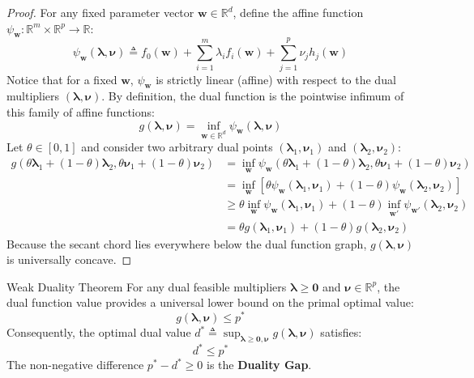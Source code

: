 \begin{proof}
For any fixed parameter vector $\mathbf{w} \in \mathbb{R}^d$, define the affine function $\psi_{\mathbf{w}}: \mathbb{R}^m \times \mathbb{R}^p \to \mathbb{R}$:
\begin{equation}
\psi_{\mathbf{w}}(\boldsymbol{\lambda}, \boldsymbol{\nu}) \triangleq f_0(\mathbf{w}) + \sum_{i=1}^m \lambda_i f_i(\mathbf{w}) + \sum_{j=1}^p \nu_j h_j(\mathbf{w})
\end{equation}
Notice that for a fixed $\mathbf{w}$, $\psi_{\mathbf{w}}$ is strictly linear (affine) with respect to the dual multipliers $(\boldsymbol{\lambda}, \boldsymbol{\nu})$.
By definition, the dual function is the pointwise infimum of this family of affine functions:
\begin{equation}
g(\boldsymbol{\lambda}, \boldsymbol{\nu}) = \inf_{\mathbf{w} \in \mathbb{R}^d} \psi_{\mathbf{w}}(\boldsymbol{\lambda}, \boldsymbol{\nu})
\end{equation}
Let $\theta \in [0, 1]$ and consider two arbitrary dual points $(\boldsymbol{\lambda}_1, \boldsymbol{\nu}_1)$ and $(\boldsymbol{\lambda}_2, \boldsymbol{\nu}_2)$:
\begin{align}
g(\theta \boldsymbol{\lambda}_1 + (1-\theta)\boldsymbol{\lambda}_2, \theta \boldsymbol{\nu}_1 + (1-\theta)\boldsymbol{\nu}_2)
&= \inf_{\mathbf{w}} \psi_{\mathbf{w}}(\theta \boldsymbol{\lambda}_1 + (1-\theta)\boldsymbol{\lambda}_2, \theta \boldsymbol{\nu}_1 + (1-\theta)\boldsymbol{\nu}_2) \nonumber \\
&= \inf_{\mathbf{w}} \left[ \theta \psi_{\mathbf{w}}(\boldsymbol{\lambda}_1, \boldsymbol{\nu}_1) + (1-\theta) \psi_{\mathbf{w}}(\boldsymbol{\lambda}_2, \boldsymbol{\nu}_2) \right] \nonumber \\
&\ge \theta \inf_{\mathbf{w}} \psi_{\mathbf{w}}(\boldsymbol{\lambda}_1, \boldsymbol{\nu}_1) + (1-\theta) \inf_{\mathbf{w}'} \psi_{\mathbf{w}'}(\boldsymbol{\lambda}_2, \boldsymbol{\nu}_2) \nonumber \\
&= \theta g(\boldsymbol{\lambda}_1, \boldsymbol{\nu}_1) + (1-\theta) g(\boldsymbol{\lambda}_2, \boldsymbol{\nu}_2)
\end{align}
Because the secant chord lies everywhere below the dual function graph, $g(\boldsymbol{\lambda}, \boldsymbol{\nu})$ is universally concave.
\end{proof}

\begin{theorembox}{Weak Duality Theorem}
For any dual feasible multipliers $\boldsymbol{\lambda} \ge \mathbf{0}$ and $\boldsymbol{\nu} \in \mathbb{R}^p$, the dual function value provides a universal lower bound on the primal optimal value:
\begin{equation}
g(\boldsymbol{\lambda}, \boldsymbol{\nu}) \le p^*
\label{eq:weak_duality}
\end{equation}
Consequently, the optimal dual value $d^* \triangleq \sup_{\boldsymbol{\lambda} \ge \mathbf{0}, \boldsymbol{\nu}} g(\boldsymbol{\lambda}, \boldsymbol{\nu})$ satisfies:
\begin{equation}
d^* \le p^*
\end{equation}
The non-negative difference $p^* - d^* \ge 0$ is the \textbf{Duality Gap}.
\end{theorembox}

